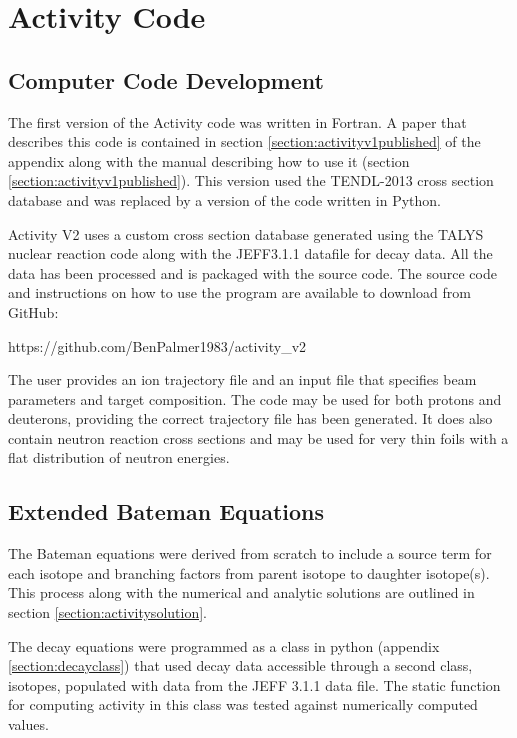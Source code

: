\FloatBarrier
\section{Activity Code}


\subsection{Computer Code Development}

The first version of the Activity code was written in Fortran.  A paper that describes this code is contained in section \ref{section:activityv1published} of the appendix along with the manual describing how to use it (section \ref{section:activityv1published}).  This version used the TENDL-2013 cross section database and was replaced by a version of the code written in Python.

Activity V2 uses a custom cross section database generated using the TALYS nuclear reaction code along with the JEFF3.1.1 datafile for decay data.  All the data has been processed and is packaged with the source code.  The source code and instructions on how to use the program are available to download from GitHub: 

https://github.com/BenPalmer1983/activity\_v2

The user provides an ion trajectory file and an input file that specifies beam parameters and target composition.  The code may be used for both protons and deuterons, providing the correct trajectory file has been generated.  It does also contain neutron reaction cross sections and may be used for very thin foils with a flat distribution of neutron energies.




\subsection{Extended Bateman Equations}

The Bateman equations were derived from scratch to include a source term for each isotope and branching factors from parent isotope to daughter isotope(s).  This process along with the numerical and analytic solutions are outlined in section \ref{section:activitysolution}.

\FloatBarrier

The decay equations were programmed as a class in python (appendix \ref{section:decayclass}) that used decay data accessible through a second class, isotopes, populated with data from the JEFF 3.1.1 data file.  The static function for computing activity in this class was tested against numerically computed values.  

